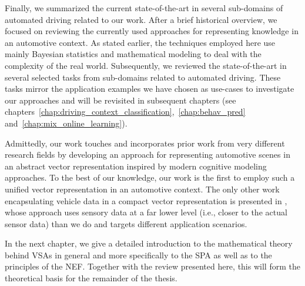 Finally, we summarized the current state-of-the-art in several sub-domains of automated driving related to our work.
After a brief historical overview, we focused on reviewing the currently used approaches for representing knowledge in an automotive context.
As stated earlier, the techniques employed here use mainly Bayesian statistics and mathematical modeling to deal with the complexity of the real world.
Subsequently, we reviewed the state-of-the-art in several selected tasks from sub-domains related to automated driving.
These tasks mirror the application examples we have chosen as use-cases to investigate our approaches and will be revisited in subsequent chapters (see chapters~\ref{chap:driving_context_classification},~\ref{chap:behav_pred} and~\ref{chap:mix_online_learning}).

Admittedly, our work touches and incorporates prior work from very different research fields by developing an approach for representing automotive scenes in an abstract vector representation inspired by modern cognitive modeling approaches.
To the best of our knowledge, our work is the first to employ such a unified vector representation in an automotive context.
The only other work encapsulating vehicle data in a compact vector representation is presented in \textcite{Hallac2018}, whose approach uses sensory data at a far lower level (i.e., closer to the actual sensor data) than we do and targets different application scenarios.

In the next chapter, we give a detailed introduction to the mathematical theory behind \acp{VSA} in general and more specifically to the \ac{SPA} as well as to the principles of the \ac{NEF}.
Together with the review presented here, this  will form the theoretical basis for the remainder of the thesis.
